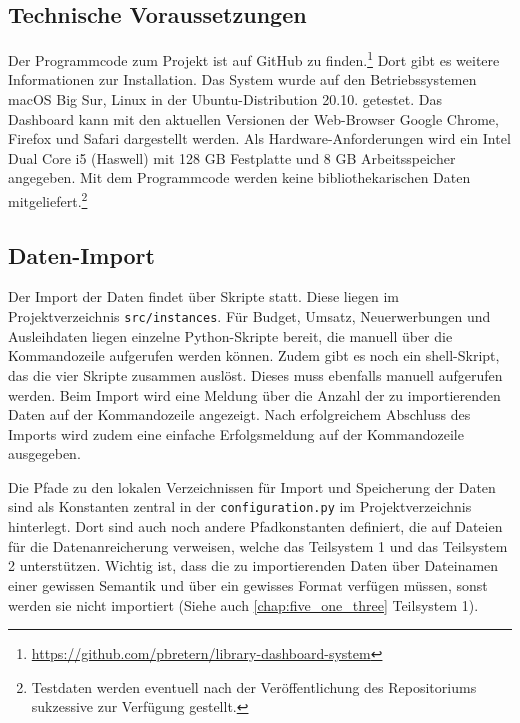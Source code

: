     \subsection{Technische Voraussetzungen}
    Der Programmcode zum Projekt ist auf GitHub zu finden.\footnote{\url{https://github.com/pbretern/library-dashboard-system}} Dort gibt es weitere Informationen zur Installation.
    Das System wurde auf den Betriebssystemen macOS Big Sur, Linux in der Ubuntu-Distribution 20.10. getestet.
    Das Dashboard kann mit den aktuellen Versionen der Web-Browser Google Chrome, Firefox und Safari dargestellt werden. 
    Als Hardware-Anforderungen wird ein Intel Dual Core i5 (Haswell) mit 128 GB Festplatte und 8 GB Arbeitsspeicher angegeben. 
    Mit dem Programmcode werden keine bibliothekarischen Daten mitgeliefert.\footnote{Testdaten werden eventuell nach der Veröffentlichung des Repositoriums
    sukzessive zur Verfügung gestellt.}
    
    \subsection{Daten-Import}
    Der Import der Daten findet über Skripte statt. Diese liegen im Projektverzeichnis \texttt{src/instances}.
    Für Budget, Umsatz, Neuerwerbungen und Ausleihdaten liegen einzelne Python-Skripte bereit, die manuell über die Kommandozeile
    aufgerufen werden können. Zudem gibt es noch ein shell-Skript, das die vier Skripte zusammen auslöst. Dieses
    muss ebenfalls manuell aufgerufen werden.
    Beim Import wird eine Meldung über die Anzahl der zu importierenden Daten auf der Kommandozeile angezeigt. 
    Nach erfolgreichem Abschluss des Imports wird zudem eine einfache Erfolgsmeldung auf der Kommandozeile ausgegeben.

    Die Pfade zu den lokalen Verzeichnissen für Import und Speicherung der Daten sind als Konstanten zentral in der \texttt{configuration.py}
    im Projektverzeichnis hinterlegt. Dort sind auch noch andere Pfadkonstanten definiert, die auf Dateien für die Datenanreicherung verweisen, welche das Teilsystem 1
    und das Teilsystem 2 unterstützen. Wichtig ist, dass die zu importierenden Daten über Dateinamen einer gewissen Semantik und 
    über ein gewisses Format verfügen müssen, sonst werden sie nicht importiert (Siehe auch \autoref{chap:five_one_three} Teilsystem 1).

